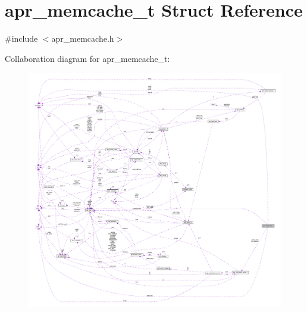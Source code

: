 \hypertarget{structapr__memcache__t}{}\section{apr\+\_\+memcache\+\_\+t Struct Reference}
\label{structapr__memcache__t}


{\ttfamily \#include $<$apr\+\_\+memcache.\+h$>$}



Collaboration diagram for apr\+\_\+memcache\+\_\+t\+:
\nopagebreak
\begin{figure}[H]
\begin{center}
\leavevmode
\includegraphics[width=350pt]{structapr__memcache__t__coll__graph}
\end{center}
\end{figure}
